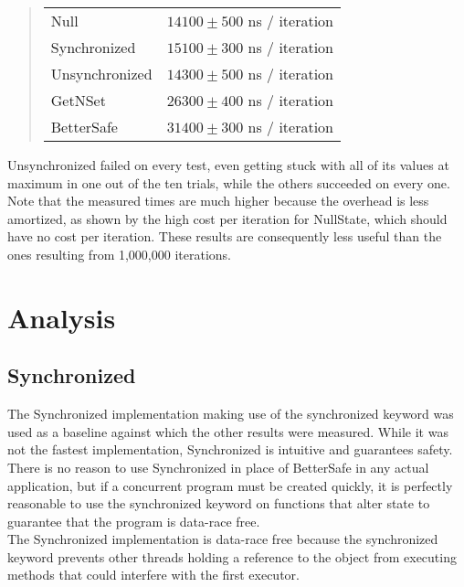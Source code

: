 \documentclass[letterpaper,twocolumn,10pt]{article}
\begin{document}
\begin{quote}
\begin{tabular}{lr}
Null&$14100\pm500$ ns / iteration \\
Synchronized&$15100\pm300$ ns / iteration \\
Unsynchronized&$14300\pm500$ ns / iteration \\
GetNSet&$26300\pm400$ ns / iteration \\
BetterSafe&$31400\pm300$ ns / iteration \\
\end{tabular}
\end{quote}
Unsynchronized failed on every test, even getting stuck with all of its values at maximum in one out of the ten trials, while the others succeeded on every one. \\
Note that the measured times are much higher because the overhead is less amortized, as shown by the high cost per iteration for NullState, which should have no cost per iteration. These results are consequently less useful than the ones resulting from 1,000,000 iterations.

\section{Analysis}
\subsection{Synchronized}
The Synchronized implementation making use of the synchronized keyword was used as a baseline against which the other results were measured. While it was not the fastest implementation, Synchronized is intuitive and guarantees safety. There is no reason to use Synchronized in place of BetterSafe in any actual application, but if a concurrent program must be created quickly, it is perfectly reasonable to use the synchronized keyword on functions that alter state to guarantee that the program is data-race free. \\
The Synchronized implementation is data-race free because the synchronized keyword prevents other threads holding a reference to the object from executing methods that could interfere with the first executor.
\end{document}

